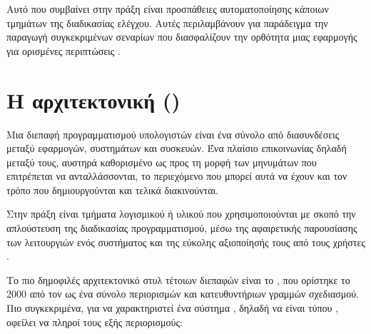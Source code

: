 Αυτό που συμβαίνει στην πράξη είναι προσπάθειες αυτοματοποίησης κάποιων τμημάτων της διαδικασίας ελέγχου.
Αυτές περιλαμβάνουν για παράδειγμα την παραγωγή συγκεκριμένων σεναρίων που διασφαλίζουν την ορθότητα μιας εφαρμογής 
για ορισμένες περιπτώσεις \cite{sneha2017research}.

\section{Η αρχιτεκτονική  ()}
Μια διεπαφή προγραμματισμού υπολογιστών  είναι ένα σύνολο από διασυνδέσεις μεταξύ εφαρμογών, συστημάτων και συσκευών.
Ένα πλαίσιο επικοινωνίας δηλαδή μεταξύ τους, αυστηρά καθορισμένο ως προς τη μορφή των μηνυμάτων που επιτρέπεται να ανταλλάσσονται, 
το περιεχόμενο που μπορεί αυτά να έχουν και τον τρόπο που δημιουργούνται και τελικά διακινούνται.

Στην πράξη είναι τμήματα λογισμικού ή υλικού που χρησιμοποιούνται με σκοπό την απλούστευση της διαδικασίας προγραμματισμού,
μέσω της αφαιρετικής παρουσίασης των λειτουργιών ενός συστήματος και της εύκολης αξιοποίησής τους από τους χρήστες \cite{date_relational_1975}.

Το πιο δημοφιλές αρχιτεκτονικό στυλ τέτοιων διεπαφών είναι το ,
που ορίστηκε το 2000 από τον  \cite{fielding_architectural_2000} ως ένα σύνολο περιορισμών και κατευθυντήριων γραμμών σχεδιασμού.
Πιο συγκεκριμένα, για να χαρακτηριστεί ένα σύστημα , δηλαδή να είναι τύπου , οφείλει να πληροί τους εξής περιορισμούς:

